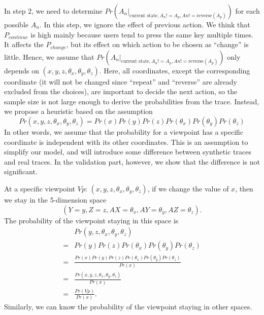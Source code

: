 In step 2, we need to determine $Pr(A_n |_{\textrm{current state}, A_n != A_p, An != \textrm{reverse}(A_p)})$
for each possible $A_n$. In this step, we ignore the effect of previous action. 
We think that $P_{continue}$ is high mainly because users tend to press the same key multiple times. 
It affects the $P_{change}$, but its effect on which action to be chosen as ``change'' is little.
Hence, we assume that $Pr(A_n |_{\textrm{current state}, A_n != A_p, An != \textrm{reverse}(A_p)})$
only depends on $(x, y, z, \theta_x, \theta_y, \theta_z)$. Here, all coordinates, except the corresponding coordinate
(it will not be changed since ``repeat'' and ``reverse'' are already excluded from the choices),
are important to decide the next action, so the sample size is not large enough to derive the probabilities
from the trace.
Instead, we propose a heuristic based on the assumption
\[
    Pr(x, y, z, \theta_x, \theta_y, \theta_z) = Pr(x)Pr(y)Pr(z)Pr(\theta_x)Pr(\theta_y)Pr(\theta_z)
\]
In other words, we assume that the probability for a viewpoint has a specific coordinate is independent with its 
other coordinates. This is an assumption to simplify our model, and will introduce some difference between
synthetic traces and real traces. In the validation part, however, we show that the difference is not 
significant.

At a specific viewpoint $Vp$: $(x, y, z, \theta_x, \theta_y, \theta_z)$, if we change the value of $x$, 
then we stay in the 5-dimension space
\[
    (Y=y, Z=z, AX=\theta_x, AY=\theta_y, AZ=\theta_z).
\]
The probability of the viewpoint staying in this space is 
\begin{align*}
    &Pr(y, z, \theta_x, \theta_y, \theta_z)\\
    =&Pr(y)Pr(z)Pr(\theta_x)Pr(\theta_y)Pr(\theta_z)\\
    =&\frac{Pr(x)Pr(y)Pr(z)Pr(\theta_x)Pr(\theta_y)Pr(\theta_z)}{Pr(x)}\\
    =&\frac{Pr(x, y, z, \theta_x, \theta_y, \theta_z)}{Pr(x)}\\
    =&\frac{Pr(Vp)}{Pr(x)}.
\end{align*}
Similarly, we can know the probability of the viewpoint staying in other spaces. 

